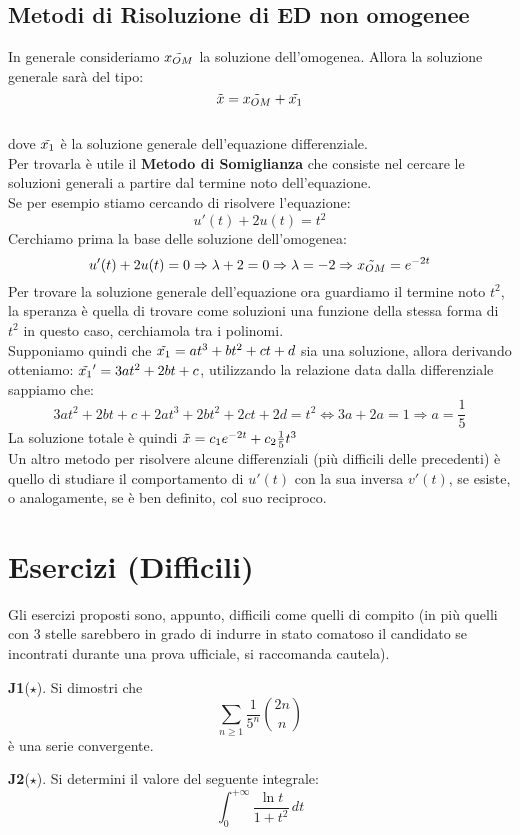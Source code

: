 \documentclass[a4paper,twoside]{article}
\theoremstyle{definition}
\numberwithin{theorem}{section}
\begin{document}
\subsection{Metodi di Risoluzione di ED non omogenee}
In generale consideriamo $\Tilde{x_{OM}}$ la soluzione dell'omogenea. Allora la soluzione generale sarà del tipo: $$\Tilde{x}= \Tilde{x_{OM}}+ \Tilde{x_1}$$\\
dove $\Tilde{x_1}$ è la soluzione generale dell'equazione differenziale.\\
Per trovarla è utile il \textbf{Metodo di Somiglianza} che consiste nel cercare le soluzioni generali a partire dal termine noto dell'equazione.\\
Se per esempio stiamo cercando di risolvere l'equazione:
$$u'(t)+2u(t)=t^2$$
Cerchiamo prima la base delle soluzione dell'omogenea:$$u'(t)+2u(t)=0\Rightarrow \lambda +2 =0 \Rightarrow \lambda=-2 \Rightarrow \Tilde{x_{OM}}=e^{-2t}$$
Per trovare la soluzione generale dell'equazione ora guardiamo il termine noto $t^2$, la speranza è quella di trovare come soluzioni una funzione della stessa forma di $t^2$ in questo caso, cerchiamola tra i polinomi.\\
Supponiamo quindi che $\Tilde{x_1}=at^3+bt^2+ct+d$ sia una soluzione, allora derivando otteniamo: $\Tilde{x_1}'=3at^2+2bt+c$, utilizzando la relazione data dalla differenziale sappiamo che:
$$3at^2+2bt+c + 2at^3+2bt^2+2ct+2d=t^2\Leftrightarrow 3a+2a=1\Rightarrow a=\frac{1}{5}$$
La soluzione totale è quindi $\Tilde{x}= c_1e^{-2t}+c_2\frac{1}{5}t^3$\\
Un altro metodo per risolvere alcune differenziali (più difficili delle precedenti) è quello di studiare il comportamento di $u'(t)$ con la sua inversa $v'(t)$, se esiste, o analogamente, se è ben definito, col suo reciproco.
\section{Esercizi (Difficili)}
Gli esercizi proposti sono, appunto, difficili come quelli di compito (in più quelli con 3 stelle sarebbero in grado di indurre in stato comatoso il candidato se incontrati durante una prova ufficiale, si raccomanda cautela).
\par

 \textbf{J1}($\star$). Si dimostri che 
\begin{equation*}
 \sum_{n\geq 1}\frac{1}{5^n}\binom{2n}{n}   
\end{equation*}
è una serie convergente.


\textbf{J2}($\star$). Si determini il valore del seguente integrale: 
\begin{equation*}
 \int_{0}^{+\infty}\frac{\ln t}{1+t^2}\,dt   
\end{equation*}
\end{document}
